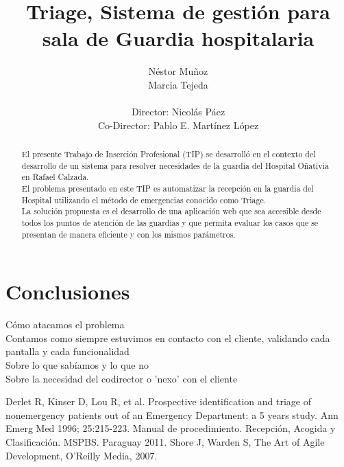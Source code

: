 \documentclass[a4paper,10pt]{article}
\title{Triage, Sistema de gestión para sala de Guardia hospitalaria}
\author{Néstor Muñoz\\ Marcia Tejeda\\ \\ Director: Nicolás Páez \\  Co-Director: Pablo E. Martínez López}
\begin{document}
\maketitle
\newpage 
\begin{abstract}
El presente Trabajo de Inserción Profesional (TIP) se desarrolló en el contexto del desarrollo de un sistema para resolver necesidades de la guardia del Hospital Oñativia en Rafael Calzada.\\ 
El problema presentado en este TIP es automatizar la recepción en la guardia del Hospital utilizando el método de emergencias conocido como Triage.\\ 
La solución propuesta es el desarrollo de una aplicación web que sea accesible desde todos los puntos de atención de las guardias y que permita evaluar los casos que se presentan de manera eficiente y con los mismos parámetros.

\end{abstract}


\newpage 
\tableofcontents


\newpage 


\newpage 


\newpage 


\newpage 
\section{Conclusiones}
Cómo atacamos el problema\\
Contamos como siempre estuvimos en contacto con el cliente, validando cada pantalla y cada funcionalidad\\
Sobre lo que sabíamos y lo que no\\
Sobre la necesidad del codirector o 'nexo' con el cliente



\newpage 

\begin{thebibliography}{3} 
 Derlet R, Kinser D, Lou R, et al. Prospective identification and triage of nonemergency patients out of an Emergency Department: a 5 years study. Ann Emerg Med 1996; 25:215-223.
 Manual de procedimiento. Recepción,  Acogida y Clasificación.  MSPBS. Paraguay 2011.
 Shore J, Warden S, The Art of Agile Development, O’Reilly Media, 2007.

\end{thebibliography}
 
\end{document}
